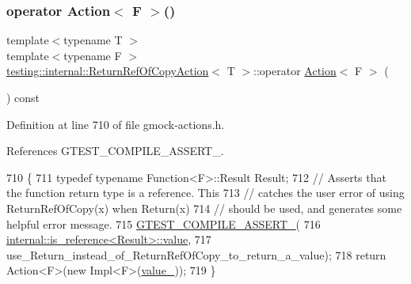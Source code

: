 \mbox{\label{classtesting_1_1internal_1_1ReturnRefOfCopyAction_a8b4829fbb46c3ca6468f3eb5c5b42493}} 
\subsubsection{\texorpdfstring{operator Action$<$ F $>$()}{operator Action< F >()}}
{\footnotesize\ttfamily template$<$typename T $>$ \\
template$<$typename F $>$ \\
\hyperlink{classtesting_1_1internal_1_1ReturnRefOfCopyAction}{testing\+::internal\+::\+Return\+Ref\+Of\+Copy\+Action}$<$ T $>$\+::operator \hyperlink{classtesting_1_1Action}{Action}$<$ F $>$ (\begin{DoxyParamCaption}{ }\end{DoxyParamCaption}) const\hspace{0.3cm}{\ttfamily [inline]}}



Definition at line 710 of file gmock-\/actions.\+h.



References G\+T\+E\+S\+T\+\_\+\+C\+O\+M\+P\+I\+L\+E\+\_\+\+A\+S\+S\+E\+R\+T\+\_\+.


\begin{DoxyCode}
710                              \{
711     \textcolor{keyword}{typedef} \textcolor{keyword}{typename} Function<F>::Result Result;
712     \textcolor{comment}{// Asserts that the function return type is a reference.  This}
713     \textcolor{comment}{// catches the user error of using ReturnRefOfCopy(x) when Return(x)}
714     \textcolor{comment}{// should be used, and generates some helpful error message.}
715     \hyperlink{gtest-port_8h_ae1f37dc71d5daa6fb49ca1b6047d4a8c}{GTEST\_COMPILE\_ASSERT\_}(
716         \hyperlink{structtesting_1_1internal_1_1bool__constant_a499fba6576296b04d99690a486424b32}{internal::is\_reference<Result>::value},
717         use\_Return\_instead\_of\_ReturnRefOfCopy\_to\_return\_a\_value);
718     \textcolor{keywordflow}{return} Action<F>(\textcolor{keyword}{new} Impl<F>(\hyperlink{classtesting_1_1internal_1_1ReturnRefOfCopyAction_a41fdd44b2021e01db916c6d5afcbf73f}{value\_}));
719   \}
\end{DoxyCode}


